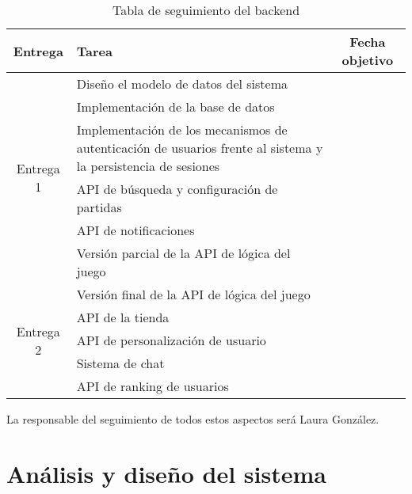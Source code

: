 \documentclass[11pt, a4paper, titlepage]{article}
\begin{document}
\renewcommand{\arraystretch}{1.3}
\begin{table}[hbt!]
\begin{adjustbox}{minipage=18cm, center}
\begin{tabularx}{\textwidth}{|c|X|c| }
\hline
Entrega & Tarea & Fecha objetivo \\\hline
\multirow{6}{*}{Entrega 1}& Diseño el modelo de datos del sistema & \\\cline{2-3}
 & Implementación de la base de datos & \\\cline{2-3}
 & Implementación de los mecanismos de autenticación de usuarios frente al sistema y la persistencia de sesiones &  \\\cline{2-3}
 & API de búsqueda y configuración de partidas &  \\\cline{2-3}
 & API de notificaciones &  \\\cline{2-3}
 & Versión parcial de la API de lógica del juego &  \\\cline{2-3}
\hline

\multirow{5}{*}{Entrega 2} & Versión final de la API de lógica del juego &  \\\cline{2-3}
& API de la tienda& \\\cline{2-3}
& API de personalización de usuario& \\\cline{2-3}
& Sistema de chat&  \\\cline{2-3}
& API de ranking de usuarios&  \\\cline{2-3}
\hline
\end{tabularx}
\caption{Tabla de seguimiento del backend}
\label{table:backend}
\end{adjustbox}
\end{table}
\FloatBarrier
 
La responsable del seguimiento de todos estos aspectos será Laura González.

\section{Análisis y diseño del sistema}
\end{document}
